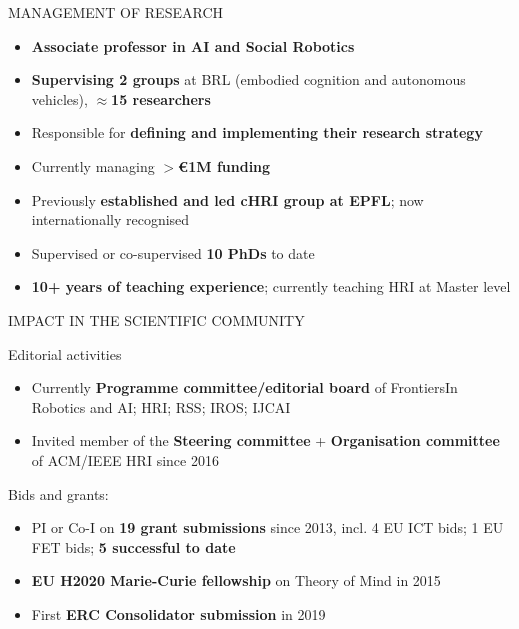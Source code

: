 \documentclass[xcolor=table]{beamer}
\begin{document}
\begin{frame}{MANAGEMENT OF RESEARCH}
    \begin{itemize}
        \item \textbf{Associate professor in AI and Social Robotics}
        \item \textbf{Supervising 2 groups} at BRL (embodied cognition and autonomous
            vehicles), $\approx$\textbf{15 researchers}
        \item Responsible for \textbf{defining and implementing their research strategy}
        \item Currently managing \textbf{$>$€1M funding}
        \item Previously \textbf{established and led cHRI group at EPFL}; now
            internationally recognised
        \item Supervised or co-supervised \textbf{10 PhDs} to date
        \item \textbf{10+ years of teaching experience}; currently teaching HRI at Master
            level
    \end{itemize}

\end{frame}

\begin{frame}{IMPACT IN THE SCIENTIFIC COMMUNITY}

    Editorial activities

    \begin{itemize}
        \item Currently \textbf{Programme committee/editorial board} of FrontiersIn Robotics and
            AI; HRI; RSS; IROS; IJCAI
        \item Invited member of the \textbf{Steering committee} + \textbf{Organisation committee} of ACM/IEEE HRI since 2016
    \end{itemize}

    Bids and grants:
    \begin{itemize}
        \item PI or Co-I on \textbf{19 grant submissions} since 2013, incl. 4 EU ICT bids; 1
            EU FET bids; \textbf{5 successful to date}
        \item \textbf{EU H2020 Marie-Curie fellowship} on Theory of Mind in 2015
        \item First \textbf{ERC Consolidator submission} in 2019
    \end{itemize}


\end{frame}
\end{document}
